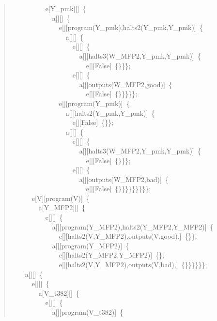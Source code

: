 \begin{quote}
{~~~~~~~~~~e[Y\_pmk][]~\{\\
~~~~~~~~~~~~a[][]~\{\\
~~~~~~~~~~~~~~e[][program(Y\_pmk),halts2(Y\_pmk,Y\_pmk)]~\{\\
~~~~~~~~~~~~~~~~a[][]~\{\\
~~~~~~~~~~~~~~~~~~e[][]~\{\\
~~~~~~~~~~~~~~~~~~~~a[][halts3(W\_MFP2,Y\_pmk,Y\_pmk)]~\{\\
~~~~~~~~~~~~~~~~~~~~~~e[][False]~\{\}\}\};\\
~~~~~~~~~~~~~~~~~~e[][]~\{\\
~~~~~~~~~~~~~~~~~~~~a[][outputs(W\_MFP2,good)]~\{\\
~~~~~~~~~~~~~~~~~~~~~~e[][False]~\{\}\}\}\}\};\\
~~~~~~~~~~~~~~e[][program(Y\_pmk)]~\{\\
~~~~~~~~~~~~~~~~a[][halts2(Y\_pmk,Y\_pmk)]~\{\\
~~~~~~~~~~~~~~~~~~e[][False]~\{\}\};\\
~~~~~~~~~~~~~~~~a[][]~\{\\
~~~~~~~~~~~~~~~~~~e[][]~\{\\
~~~~~~~~~~~~~~~~~~~~a[][halts3(W\_MFP2,Y\_pmk,Y\_pmk)]~\{\\
~~~~~~~~~~~~~~~~~~~~~~e[][False]~\{\}\}\};\\
~~~~~~~~~~~~~~~~~~e[][]~\{\\
~~~~~~~~~~~~~~~~~~~~a[][outputs(W\_MFP2,bad)]~\{\\
~~~~~~~~~~~~~~~~~~~~~~e[][False]~\{\}\}\}\}\}\}\}\}\};\\
~~~~~~e[V][program(V)]~\{\\
~~~~~~~~a[Y\_MFP2][]~\{\\
~~~~~~~~~~e[][]~\{\\
~~~~~~~~~~~~a[][program(Y\_MFP2),halts2(Y\_MFP2,Y\_MFP2)]~\{\\
~~~~~~~~~~~~~~e[][halts2(V,Y\_MFP2),outputs(V,good),]~\{\}\};\\
~~~~~~~~~~~~a[][program(Y\_MFP2)]~\{\\
~~~~~~~~~~~~~~e[][halts2(Y\_MFP2,Y\_MFP2)]~\{\};\\
~~~~~~~~~~~~~~e[][halts2(V,Y\_MFP2),outputs(V,bad),]~\{\}\}\}\}\}\};\\
~~~~a[][]~\{\\
~~~~~~e[][]~\{\\
~~~~~~~~a[V\_t382][]~\{\\
~~~~~~~~~~e[][]~\{\\
~~~~~~~~~~~~a[][program(V\_t382)]~\{\\
}
\end{quote}
